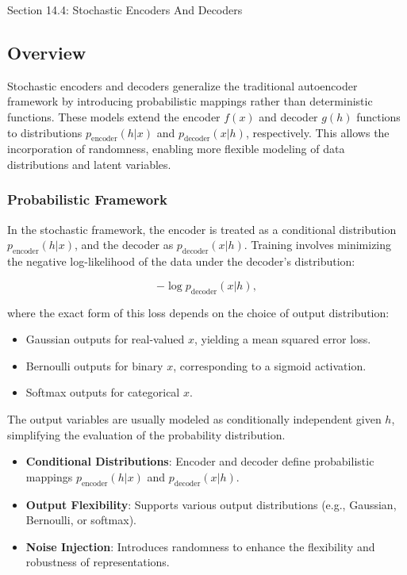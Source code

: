 \begin{notes}{Section 14.4: Stochastic Encoders And Decoders}
    \subsection*{Overview}

    Stochastic encoders and decoders generalize the traditional autoencoder framework by introducing probabilistic mappings rather than deterministic functions. These models extend the encoder $f(x)$ 
    and decoder $g(h)$ functions to distributions $p_{\text{encoder}}(h|x)$ and $p_{\text{decoder}}(x|h)$, respectively. This allows the incorporation of randomness, enabling more flexible 
    modeling of data distributions and latent variables.
    
    \subsubsection*{Probabilistic Framework}
    
    In the stochastic framework, the encoder is treated as a conditional distribution $p_{\text{encoder}}(h|x)$, and the decoder as $p_{\text{decoder}}(x|h)$. Training involves minimizing the 
    negative log-likelihood of the data under the decoder's distribution:
    
    \[
    -\log p_{\text{decoder}}(x|h),
    \]
    
    where the exact form of this loss depends on the choice of output distribution:
    \begin{itemize}
        \item Gaussian outputs for real-valued $x$, yielding a mean squared error loss.
        \item Bernoulli outputs for binary $x$, corresponding to a sigmoid activation.
        \item Softmax outputs for categorical $x$.
    \end{itemize}
    
    The output variables are usually modeled as conditionally independent given $h$, simplifying the evaluation of the probability distribution.
    
    \begin{highlight}
        \begin{itemize}
            \item \textbf{Conditional Distributions}: Encoder and decoder define probabilistic mappings $p_{\text{encoder}}(h|x)$ and $p_{\text{decoder}}(x|h)$.
            \item \textbf{Output Flexibility}: Supports various output distributions (e.g., Gaussian, Bernoulli, or softmax).
            \item \textbf{Noise Injection}: Introduces randomness to enhance the flexibility and robustness of representations.
        \end{itemize}
    \end{highlight}
    

\end{notes}
